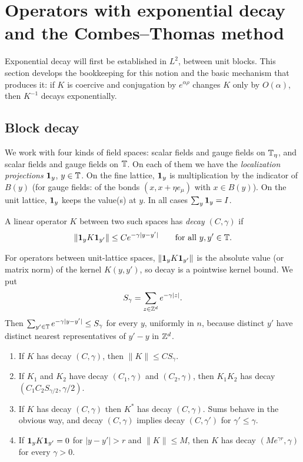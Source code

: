 \section{Operators with exponential decay and the Combes--Thomas method}\label{sec:decay}

Exponential decay will first be established in $L^2$, between unit blocks. This section develops the bookkeeping for this notion and the basic mechanism that produces it: if $K$ is coercive and conjugation by $e^{\alpha\rho}$ changes $K$ only by $O(\alpha)$, then $K^{-1}$ decays exponentially.

\subsection{Block decay}

We work with four kinds of field spaces: scalar fields and gauge fields on $\mathbb T_\eta$, and scalar fields and gauge fields on $\mathbb T$. On each of them we have the \emph{localization projections} $\mathbf 1_y$, $y\in\mathbb T$. On the fine lattice, $\mathbf 1_y$ is multiplication by the indicator of $B(y)$ (for gauge fields: of the bonds $(x,x+\eta e_\mu)$ with $x\in B(y)$). On the unit lattice, $\mathbf 1_y$ keeps the value(s) at $y$. In all cases $\sum_y\mathbf 1_y=I$.

\begin{definition}\label{def:decay}
A linear operator $K$ between two such spaces has \emph{decay $(C,\gamma)$} if
\[
\|\mathbf 1_yK\mathbf 1_{y'}\|\le Ce^{-\gamma|y-y'|}\qquad\text{for all }y,y'\in\mathbb T .
\]
\end{definition}

For operators between unit-lattice spaces, $\|\mathbf 1_yK\mathbf 1_{y'}\|$ is the absolute value (or matrix norm) of the kernel $K(y,y')$, so decay is a pointwise kernel bound. We put
\[
S_\gamma=\sum_{z\in\mathbb Z^d}e^{-\gamma|z|}.
\]
Then $\sum_{y'\in\mathbb T}e^{-\gamma|y-y'|}\le S_\gamma$ for every $y$, uniformly in $n$, because distinct $y'$ have distinct nearest representatives of $y'-y$ in $\mathbb Z^d$.

\begin{lemma}\label{lem:decay-calculus}
\begin{enumerate}[label=(\alph*)]
\item If $K$ has decay $(C,\gamma)$, then $\|K\|\le CS_\gamma$.
\item If $K_1$ and $K_2$ have decay $(C_1,\gamma)$ and $(C_2,\gamma)$, then $K_1K_2$ has decay $(C_1C_2S_{\gamma/2},\gamma/2)$.
\item If $K$ has decay $(C,\gamma)$ then $K^*$ has decay $(C,\gamma)$. Sums behave in the obvious way, and decay $(C,\gamma)$ implies decay $(C,\gamma')$ for $\gamma'\le\gamma$.
\item If $\mathbf 1_yK\mathbf 1_{y'}=0$ for $|y-y'|>r$ and $\|K\|\le M$, then $K$ has decay $(Me^{\gamma r},\gamma)$ for every $\gamma>0$.
\end{enumerate}
\end{lemma}

